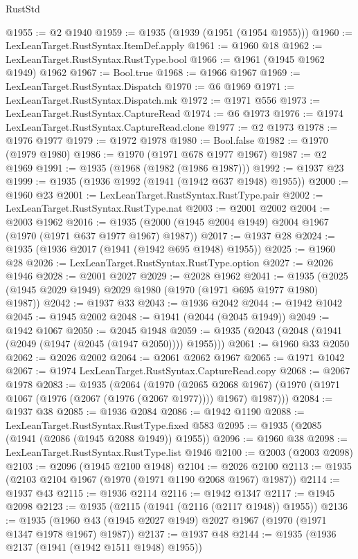 \begin{lexlean}{RustStd}
\begin{coremodule}
{\begin{coremodule}
{{{{{{{{{{{{{{{{{{{{{{{{{{{{{{{{{{{{{{{{{{{{{{{{{{{{{@1955 := @2 @1940
@1959 := @1935 (@1939 (@1951 (@1954 @1955)))
@1960 := LexLeanTarget.RustSyntax.ItemDef.apply
@1961 := @1960 @18
@1962 := LexLeanTarget.RustSyntax.RustType.bool
@1966 := @1961 (@1945 @1962 @1949) @1962
@1967 := Bool.true
@1968 := @1966 @1967
@1969 := LexLeanTarget.RustSyntax.Dispatch
@1970 := @6 @1969
@1971 := LexLeanTarget.RustSyntax.Dispatch.mk
@1972 := @1971 @556
@1973 := LexLeanTarget.RustSyntax.CaptureRead
@1974 := @6 @1973
@1976 := @1974 LexLeanTarget.RustSyntax.CaptureRead.clone
@1977 := @2 @1973
@1978 := @1976 @1977
@1979 := @1972 @1978
@1980 := Bool.false
@1982 := @1970 (@1979 @1980)
@1986 := @1970 (@1971 @678 @1977 @1967)
@1987 := @2 @1969
@1991 := @1935 (@1968 (@1982 (@1986 @1987)))
@1992 := @1937 @23
@1999 := @1935 (@1936 @1992 (@1941 (@1942 @637 @1948) @1955))
@2000 := @1960 @23
@2001 := LexLeanTarget.RustSyntax.RustType.pair
@2002 := LexLeanTarget.RustSyntax.RustType.nat
@2003 := @2001 @2002
@2004 := @2003 @1962
@2016 := @1935 (@2000 (@1945 @2004 @1949) @2004 @1967 (@1970 (@1971 @637 @1977 @1967) @1987))
@2017 := @1937 @28
@2024 := @1935 (@1936 @2017 (@1941 (@1942 @695 @1948) @1955))
@2025 := @1960 @28
@2026 := LexLeanTarget.RustSyntax.RustType.option
@2027 := @2026 @1946
@2028 := @2001 @2027
@2029 := @2028 @1962
@2041 := @1935 (@2025 (@1945 @2029 @1949) @2029 @1980 (@1970 (@1971 @695 @1977 @1980) @1987))
@2042 := @1937 @33
@2043 := @1936 @2042
@2044 := @1942 @1042
@2045 := @1945 @2002
@2048 := @1941 (@2044 (@2045 @1949))
@2049 := @1942 @1067
@2050 := @2045 @1948
@2059 := @1935 (@2043 (@2048 (@1941 (@2049 (@1947 (@2045 (@1947 @2050)))) @1955)))
@2061 := @1960 @33 @2050
@2062 := @2026 @2002
@2064 := @2061 @2062 @1967
@2065 := @1971 @1042
@2067 := @1974 LexLeanTarget.RustSyntax.CaptureRead.copy
@2068 := @2067 @1978
@2083 := @1935
    (@2064
      (@1970
        (@2065 @2068 @1967)
        (@1970 (@1971 @1067 (@1976 (@2067 (@1976 (@2067 @1977)))) @1967) @1987)))
@2084 := @1937 @38
@2085 := @1936 @2084
@2086 := @1942 @1190
@2088 := LexLeanTarget.RustSyntax.RustType.fixed @583
@2095 := @1935 (@2085 (@1941 (@2086 (@1945 @2088 @1949)) @1955))
@2096 := @1960 @38
@2098 := LexLeanTarget.RustSyntax.RustType.list @1946
@2100 := @2003 (@2003 @2098)
@2103 := @2096 (@1945 @2100 @1948)
@2104 := @2026 @2100
@2113 := @1935 (@2103 @2104 @1967 (@1970 (@1971 @1190 @2068 @1967) @1987))
@2114 := @1937 @43
@2115 := @1936 @2114
@2116 := @1942 @1347
@2117 := @1945 @2098
@2123 := @1935 (@2115 (@1941 (@2116 (@2117 @1948)) @1955))
@2136 := @1935 (@1960 @43 (@1945 @2027 @1949) @2027 @1967 (@1970 (@1971 @1347 @1978 @1967) @1987))
@2137 := @1937 @48
@2144 := @1935 (@1936 @2137 (@1941 (@1942 @1511 @1948) @1955))
}}}}}}}}}}}}}}}}}}}}}}}}}}}}}}}}}}}}}}}}}}}}}}}}}}}}}
\end{coremodule}}
\end{coremodule}
\end{lexlean}
